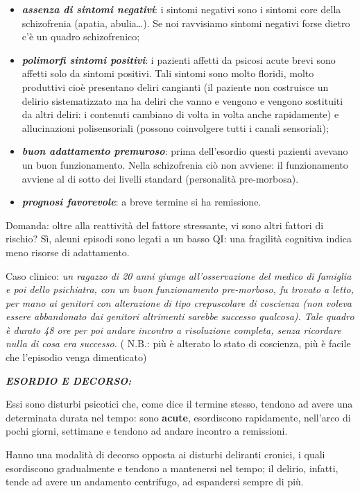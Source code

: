 \documentclass[]{article}
\begin{document}
\begin{itemize}
\item
  \textbf{\emph{assenza di sintomi negativi}}: i sintomi negativi sono i
  sintomi core della schizofrenia (apatia, abulia\ldots{}). Se noi
  ravvisiamo sintomi negativi forse dietro c'è un quadro schizofrenico;
\item
  \textbf{\emph{polimorfi sintomi positivi}}: i pazienti affetti da
  psicosi acute brevi sono affetti solo da sintomi positivi. Tali
  sintomi sono molto floridi, molto produttivi cioè presentano deliri
  cangianti (il paziente non costruisce un delirio sistematizzato ma ha
  deliri che vanno e vengono e vengono sostituiti da altri deliri: i
  contenuti cambiano di volta in volta anche rapidamente) e
  allucinazioni polisensoriali (possono coinvolgere tutti i canali
  sensoriali);
\item
  \textbf{\emph{buon adattamento premuroso}}: prima dell'esordio questi
  pazienti avevano un buon funzionamento. Nella schizofrenia ciò non
  avviene: il funzionamento avviene al di sotto dei livelli standard
  (personalità pre-morbosa).
\item
  \textbf{\emph{prognosi favorevole}}: a breve termine si ha remissione.
\end{itemize}

Domanda: oltre alla reattività del fattore stressante, vi sono altri
fattori di rischio? Sì, alcuni episodi sono legati a un basso QI: una
fragilità cognitiva indica meno risorse di adattamento.

Caso clinico: \emph{un ragazzo di 20 anni giunge all'osservazione del
medico di famiglia e poi dello psichiatra, con un buon funzionamento
pre-morboso, fu trovato a letto, per mano ai genitori con alterazione di
tipo crepuscolare di coscienza (non voleva essere abbandonato dai
genitori altrimenti sarebbe successo qualcosa). Tale quadro è durato 48
ore per poi andare incontro a risoluzione completa, senza ricordare
nulla di cosa era successo.} ( N.B.: più è alterato lo stato di
coscienza, più è facile che l'episodio venga dimenticato)

\textbf{\emph{ESORDIO E DECORSO:}}

Essi sono disturbi psicotici che, come dice il termine stesso, tendono
ad avere una determinata durata nel tempo: sono \textbf{acute},
esordiscono rapidamente, nell'arco di pochi giorni, settimane e tendono
ad andare incontro a remissioni.

Hanno una modalità di decorso opposta ai disturbi deliranti cronici, i
quali esordiscono gradualmente e tendono a mantenersi nel tempo; il
delirio, infatti, tende ad avere un andamento centrifugo, ad espandersi
sempre di più.
\end{document}
